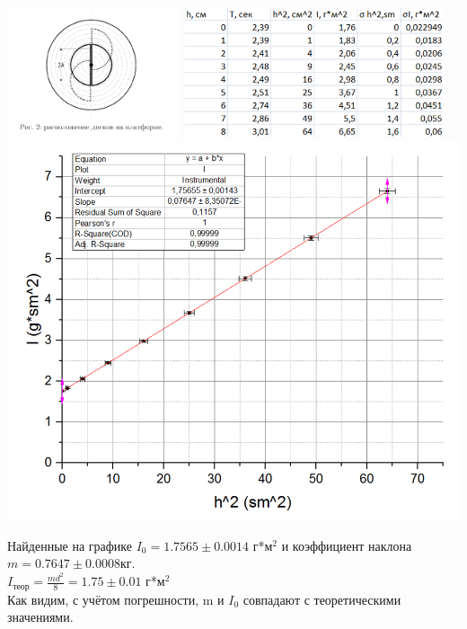 \documentclass[12pt]{article}
\begin{document}
\begin{enumerate}
	      \begin{center} 
	      	\includegraphics[width=2in]{lab2_2.png}
	      	\includegraphics[width=3in]{lab2_table.png} 
	      	\\
	      	\includegraphics[width=6in]{lab2_plot.png}
	      \end{center}
	      
	      Найденные на графике $I_0 = 1.7565 \pm 0.0014$ г*$м^2$ и коэффициент наклона $m=0.7647 \pm 0.0008$кг. \\
	      $I_{теор}=\frac{md^2}{8} = 1.75 \pm 0.01$ г*$м^2$ \\
	      Как видим, с учётом погрешности, m и $I_0$ совпадают с теоретическими значениями.
	       
		   
		   
	       


    \end{enumerate}     
\end{document}
